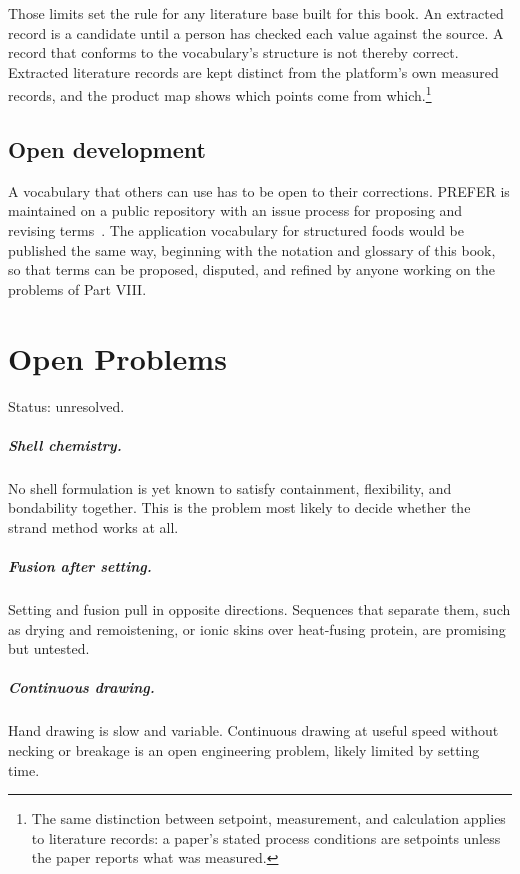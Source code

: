 \documentclass[11pt,openany]{book}
\theoremstyle{definition}
\begin{document}
Those limits set the rule for any literature base built for this book. An extracted record is a candidate until a person has checked each value against the source. A record that conforms to the vocabulary's structure is not thereby correct. Extracted literature records are kept distinct from the platform's own measured records, and the product map shows which points come from which.\footnote{The same distinction between setpoint, measurement, and calculation applies to literature records: a paper's stated process conditions are setpoints unless the paper reports what was measured.}

\section{Open development}

A vocabulary that others can use has to be open to their corrections. PREFER is maintained on a public repository with an issue process for proposing and revising terms~\cite{prefer2026}. The application vocabulary for structured foods would be published the same way, beginning with the notation and glossary of this book, so that terms can be proposed, disputed, and refined by anyone working on the problems of Part VIII.

\chapter{Open Problems}\label{ch:open}

Status: unresolved.

\paragraph{Shell chemistry.} No shell formulation is yet known to satisfy containment, flexibility, and bondability together. This is the problem most likely to decide whether the strand method works at all.

\paragraph{Fusion after setting.} Setting and fusion pull in opposite directions. Sequences that separate them, such as drying and remoistening, or ionic skins over heat-fusing protein, are promising but untested.

\paragraph{Continuous drawing.} Hand drawing is slow and variable. Continuous drawing at useful speed without necking or breakage is an open engineering problem, likely limited by setting time.
\end{document}
